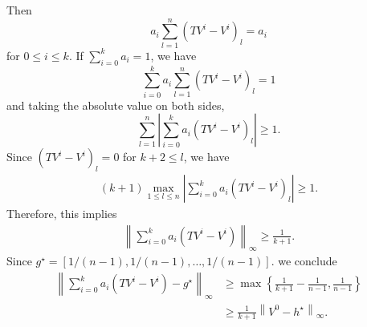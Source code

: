 \documentclass{article} %
\newcommand{\real}{\mathbb{R}}
\newcommand{\abs}[1]{\left|{#1}\right|}
\newcommand*{\para}[1]{\left({#1}\right)}
\newcommand*{\infn}[1]{\left\|{#1}\right\|_{\infty}}
\newtheorem{lemma}{Lemma}
\begin{document}
Then
\[ a_i\sum^n_{l=1}(TV^i-V^i)_l = a_i \]
for $ 0 \le i \le k$. If $\sum^{k}_{i=0}a_i=1$, we have
\[\sum^{k}_{i=0} a_i\sum^n_{l=1}(TV^i-V^i)_l = 1\]
and taking the absolute value on both sides, 
\[\sum^n_{l=1} \abs{\sum^{k}_{i=0} a_i(TV^i-V^i)_l} \ge 1.\]
Since $(TV^i-V^i)_l=0$ for $k+2 \le l$, we have
\begin{align*}
     (k+1)\max_{1\le l\le n} {\abs{\sum^{k}_{i=0} a_i(TV^i-V^i)_l}} \ge 1.
\end{align*}
Therefore, this implies
\begin{align*}\infn{\sum^{k}_{i=0} a_i(TV^i-V^i)} \ge \frac{1}{k+1}.
\end{align*}
Since $g^{\star} = [1/(n-1),1/(n-1),\dots, 1/(n-1)]$. we conclude
\begin{align*}
\infn{\sum^{k}_{i=0} a_i(TV^i-V^i)-g^{\star}} &\ge \max \left\{\frac{1}{k+1}-  \frac{1}{n-1}  , \frac{1}{n-1} \right\} 
\\ &\ge \frac{1}{k+1}\infn{V^0-h^{\star}} .
\end{align*}
\end{document}
